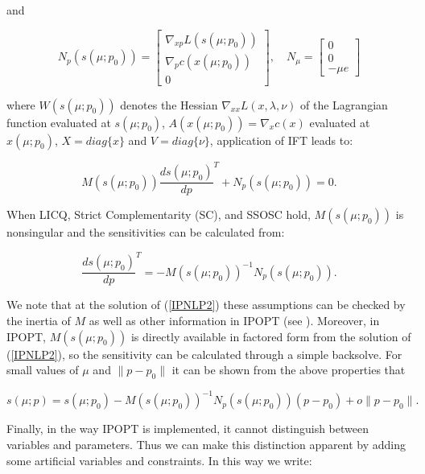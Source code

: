\documentclass[letter, 11pt]{article}
\newcommand{\vect}[1]{{\left[\begin{array}{c} #1 \end{array}\right]}}
\newcommand{\parens}[1]{\ensuremath{\left( #1 \right)}}
\newcommand{\bracs}[1]{\ensuremath{\left[ #1 \right]}}
\newcommand{\func}[2]{\ensuremath{ #1\parens{#2}  }}
\begin{document}
\noindent and

\begin{equation}  \label{ndef}
N_p(s(\mu; p_0)) =
\vect{\nabla_{xp} L(s(\mu; p_0)) \\ \nabla_p c(x(\mu; p_0))\\ 0}, \quad
N_{\mu} = \vect{0 \\ 0 \\ -\mu e}
\end{equation}

\noindent where $W(s(\mu; p_0))$ denotes the Hessian $\nabla_{xx} L(x
,\lambda, \nu)$ of the Lagrangian function evaluated at $s(\mu; p_0)$,
$A(x(\mu; p_0)) = \nabla_{x} c(x)$ evaluated at $x(\mu; p_0)$, $X =
diag\{x\}$ and $V = diag\{\nu\}$, application of IFT leads to:

\begin{equation}\label{sensfiacco}
M(s(\mu; p_0)) \frac{d s(\mu; p_0)}{d p}^T + N_p(s(\mu; p_0)) = 0.
\end{equation}

When LICQ, Strict Complementarity (SC), and SSOSC
hold, $M(s(\mu; p_0))$ is nonsingular and
the sensitivities can be calculated from:

\begin{equation} \label{sens:1}
\frac{d s(\mu; p_0)}{d p}^T =   - \func{M}{\func{s}{\mu; p_0}}^{-1} \func{N_p}{ \func{s}{\mu; p_0} } .
\end{equation}

We note that at the solution of (\ref{IPNLP2}) these assumptions can
be checked by the inertia of $M$ as well as other information in IPOPT
(see \cite{Waechter2006}).  Moreover, in IPOPT, $M(s(\mu; p_0))$ is directly
available in factored form from the solution of (\ref{IPNLP2}), so the
sensitivity can be calculated through a simple backsolve. For small
values of $\mu$ and $\|p-p_0\|$ it can be shown from the above properties
\cite{Fiacco1983} that

\begin{equation} \label{init1}
s(\mu; p) = s(\mu; p_0) - M(s(\mu; p_0))^{-1}N_p(s(\mu; p_0)) (p-p_0) +
o\|p-p_0\| . %
\end{equation}

%


Finally, in the way IPOPT is implemented, it cannot distinguish between
variables and parameters. Thus we can make this distinction apparent by
adding some artificial variables and constraints. In this way we write:
\end{document}
